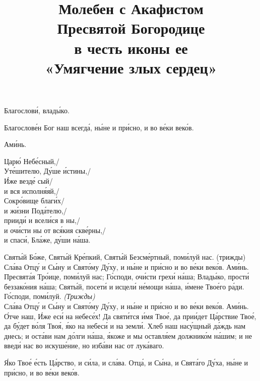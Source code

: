 \documentclass[14pt,article,oneside]{memoir}
\newcommand{\PriestRu}[0]{
  \noindent {\emph{\color{Maroon}Иерей:}}
}
\newcommand{\DeaconRu}[0]{
  \noindent {\emph{\color{Maroon}Диакон:}}
}
\newcommand{\ChoirRu}[0]{
  \noindent {\emph{\color{Maroon}Лик:}}
}
\newcommand{\ReaderRu}[0]{
  \noindent {\emph{\color{Maroon}Чтец:}}
}
\begin{document}
\title{Молебен с Акафистом \\
  Пресвятой Богородице \\
  в честь иконы ее \\
  «Умягчение злых сердец»}
\date{}

\maketitle

\DeaconRu{Благослови́, влады́ко.}

\PriestRu{Благослове́н Бог наш всегда́, ны́не и при́сно, и во ве́ки веко́в.}

\ChoirRu{Ами́нь.

  \noindent Царю́ Небе́сный,/ \\
  Уте́шителю, Ду́ше и́стины,/ \\
  И́же везде́ сый/ \\
  и вся исполня́яй,/ \\
  Сокро́вище благи́х/ \\
  и жи́зни Пода́телю,/ \\
  прииди́ и всели́ся в ны,/ \\
  и очи́сти ны от вся́кия скве́рны,/ \\
  и спаси́, Бла́же, ду́ши на́ша.

}

\ReaderRu{Святы́й Бо́же, Святы́й Кре́пкий, Святы́й Безсме́ртный, поми́луй нас. (трижды)\\
\vin Сла́ва Отцу́ и Сы́ну и Свято́му Ду́ху, и ны́не и при́сно и во ве́ки веко́в. Ами́нь.\\
\vin Пресвята́я Тро́ице, поми́луй нас; Го́споди, очи́сти грехи́ на́ша; Влады́ко, прости́ беззако́ния на́ша; Святы́й, посети́ и исцели́ не́мощи на́ша, и́мене Твое́го ра́ди.\\
\vin Го́споди, поми́луй. \emph{(Трижды)}\\
\vin Сла́ва Отцу́ и Сы́ну и Свято́му Ду́ху, и ны́не и при́сно и во ве́ки веко́в. Ами́нь.\\
\vin О́тче наш, И́же еси́ на небесе́х! Да святи́тся и́мя Твое́, да прии́дет Ца́рствие Твое́, да бу́дет во́ля Твоя́, я́ко на небеси́ и на земли́. Хлеб наш насу́щный да́ждь нам днесь; и оста́ви нам до́лги на́ша, я́коже и мы оставля́ем должнико́м на́шим; и не введи́ нас во искуше́ние, но изба́ви нас от лука́ваго.}

\PriestRu{Я́ко Твое́ е́сть Ца́рство, и си́ла, и сла́ва. Отца́, и Сы́на, и Свята́го Ду́ха, ны́не и при́сно, и во ве́ки веко́в.}
\end{document}
